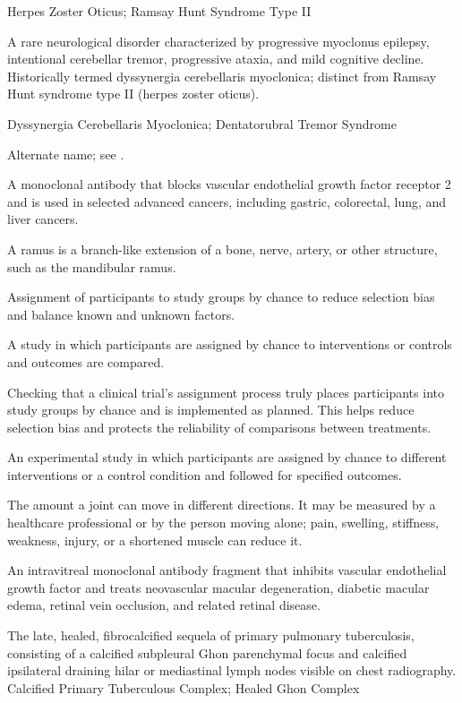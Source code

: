 \synonyms
Herpes Zoster Oticus; Ramsay Hunt Syndrome Type II

 A rare neurological disorder characterized by progressive myoclonus epilepsy, intentional cerebellar tremor, progressive ataxia, and mild cognitive decline. Historically termed dyssynergia cerebellaris myoclonica; distinct from Ramsay Hunt syndrome type II (herpes zoster oticus).

\synonyms
Dyssynergia Cerebellaris Myoclonica; Dentatorubral Tremor Syndrome

 Alternate name; see .

 A monoclonal antibody that blocks vascular endothelial growth factor receptor 2 and is used in selected advanced cancers, including gastric, colorectal, lung, and liver cancers.

 A ramus is a branch-like extension of a bone, nerve, artery, or other structure, such as the mandibular ramus.

 Assignment of participants to study groups by chance to reduce selection bias and balance known and unknown factors.

 A study in which participants are assigned by chance to interventions or controls and outcomes are compared.

 Checking that a clinical trial's assignment process truly places participants into study groups by chance and is implemented as planned. This helps reduce selection bias and protects the reliability of comparisons between treatments.

 An experimental study in which participants are assigned by chance to different interventions or a control condition and followed for specified outcomes.

 The amount a joint can move in different directions. It may be measured by a healthcare professional or by the person moving alone; pain, swelling, stiffness, weakness, injury, or a shortened muscle can reduce it.

 An intravitreal monoclonal antibody fragment that inhibits vascular endothelial growth factor and treats neovascular macular degeneration, diabetic macular edema, retinal vein occlusion, and related retinal disease.

 The late, healed, fibrocalcified sequela of primary pulmonary tuberculosis, consisting of a calcified subpleural Ghon parenchymal focus and calcified ipsilateral draining hilar or mediastinal lymph nodes visible on chest radiography.
\synonyms
Calcified Primary Tuberculous Complex; Healed Ghon Complex

